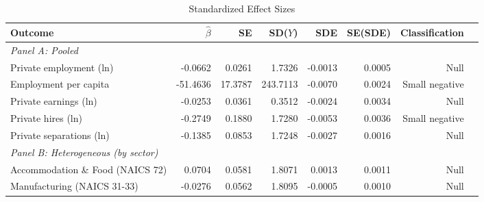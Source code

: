\begin{table}[t]
\centering
\caption{Standardized Effect Sizes}
\label{tab:sde}
\begin{adjustbox}{max width=\textwidth}
\begin{tabular}{l *{6}{r} l}
\hline\hline
Outcome & $\hat{\beta}$ & SE & SD($Y$) & SDE & SE(SDE) & Classification \\
\hline
\multicolumn{7}{l}{\textit{Panel A: Pooled}} \\
Private employment (ln) & -0.0662 & 0.0261 & 1.7326 & -0.0013 & 0.0005 & Null \\
Employment per capita & -51.4636 & 17.3787 & 243.7113 & -0.0070 & 0.0024 & Small negative \\
Private earnings (ln) & -0.0253 & 0.0361 & 0.3512 & -0.0024 & 0.0034 & Null \\
Private hires (ln) & -0.2749 & 0.1880 & 1.7280 & -0.0053 & 0.0036 & Small negative \\
Private separations (ln) & -0.1385 & 0.0853 & 1.7248 & -0.0027 & 0.0016 & Null \\
\hline
\multicolumn{7}{l}{\textit{Panel B: Heterogeneous (by sector)}} \\
Accommodation \& Food (NAICS 72) & 0.0704 & 0.0581 & 1.8071 & 0.0013 & 0.0011 & Null \\
Manufacturing (NAICS 31-33) & -0.0276 & 0.0562 & 1.8095 & -0.0005 & 0.0010 & Null \\
\hline\hline
\end{tabular}
\end{adjustbox}

\end{table}
